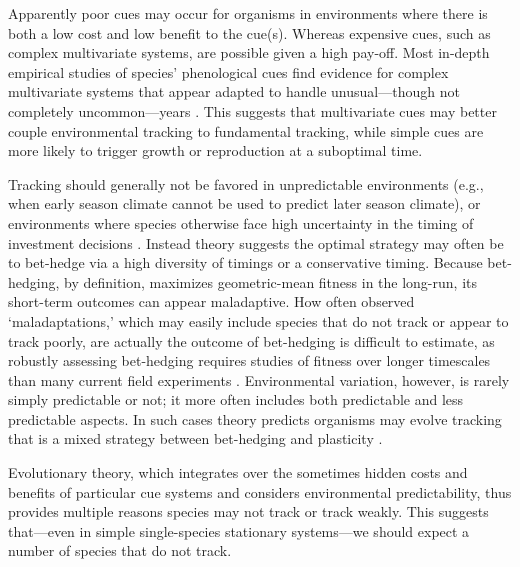 \documentclass[11pt,letterpaper]{article}
\begin{document}
Apparently poor cues may occur for organisms in environments where there is both a low cost and low benefit to the cue(s). Whereas expensive cues, such as complex multivariate systems, are possible given a high pay-off. Most in-depth empirical studies of species' phenological cues find evidence for complex multivariate systems that appear adapted to handle unusual---though not completely uncommon---years \citep{chuinearees}.  This suggests that multivariate cues may better couple environmental tracking to fundamental tracking, while simple cues are more likely to trigger growth or reproduction at a suboptimal time.

Tracking should generally not be favored in unpredictable environments (e.g., when early season climate cannot be used to predict later season climate), or environments where species otherwise face high uncertainty in the timing of investment decisions \citep{Gavrilets1993}. Instead theory suggests the optimal strategy may often be to bet-hedge \citep{Venable:2007os,donald2013,decasas2015} via a high diversity of timings or a conservative timing. Because bet-hedging, by definition, maximizes geometric-mean fitness in the long-run, its short-term outcomes can appear maladaptive. How often observed `maladaptations,' which may easily include species that do not track or appear to track poorly, are actually the outcome of bet-hedging is difficult to estimate, as robustly assessing bet-hedging requires studies of fitness over longer timescales than many current field experiments \citep{simons2011}. Environmental variation, however, is rarely simply predictable or not; it more often includes both predictable and less predictable aspects. In such cases theory predicts organisms may evolve tracking that is a mixed strategy between bet-hedging and plasticity \citep{wong2005}. 

Evolutionary theory, which integrates over the sometimes hidden costs and benefits of particular cue systems and considers environmental predictability, thus provides multiple reasons species may not track or track weakly. This suggests that---even in simple single-species stationary systems---we should expect a number of species that do not track.
\end{document}
